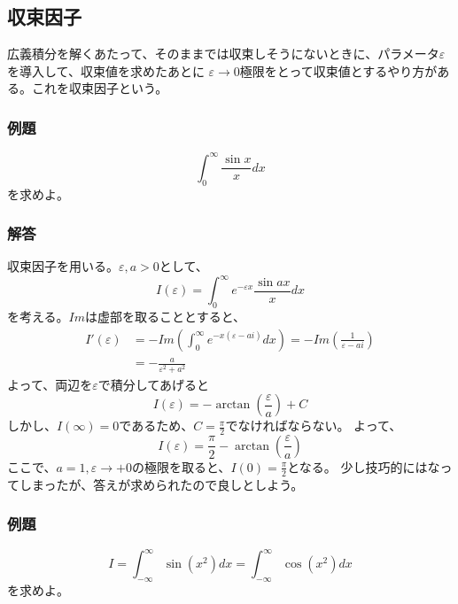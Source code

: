 \documentclass[a4j,dvipdfmx]{jsarticle}
\begin{document}
\subsection{収束因子}
広義積分を解くあたって、そのままでは収束しそうにないときに、パラメータ$\varepsilon$を導入して、収束値を求めたあとに
$\varepsilon\to 0$極限をとって収束値とするやり方がある。これを収束因子という。
\subsubsection*{例題}
\begin{equation*}
    \int_0^\infty \frac{\sin x}{x}dx
\end{equation*}
を求めよ。
\subsubsection*{解答}
収束因子を用いる。$\varepsilon,a>0$として、
\begin{equation*}
    I(\varepsilon)=\int_0^\infty e^{-\varepsilon x}\frac{\sin ax}{x}dx
\end{equation*}
を考える。$Im$は虚部を取ることとすると、
\begin{align*}
    I'(\varepsilon)&=-Im\left(\int_0^\infty e^{-x(\varepsilon-ai)}dx\right)=-Im\left(\frac{1}{\varepsilon-ai}\right)\\
    &=-\frac{a}{\varepsilon^2+a^2}
\end{align*}
よって、両辺を$\varepsilon$で積分してあげると
\begin{equation*}
    I(\varepsilon)=-\arctan(\frac{\varepsilon}{a})+C
\end{equation*}
しかし、$I(\infty)=0$であるため、$C=\frac{\pi}{2}$でなければならない。
よって、
\begin{equation*}
    I(\varepsilon)=\frac{\pi}{2}-\arctan(\frac{\varepsilon}{a})
\end{equation*}
ここで、$a=1,\varepsilon\to+0$の極限を取ると、$\displaystyle I(0)=\frac{\pi}{2}$となる。
少し技巧的にはなってしまったが、答えが求められたので良しとしよう。
\subsubsection*{例題}
\begin{equation*}
    I=\int_{-\infty}^\infty \sin(x^2)dx=\int_{-\infty}^\infty \cos(x^2)dx
\end{equation*}
を求めよ。
\end{document}
